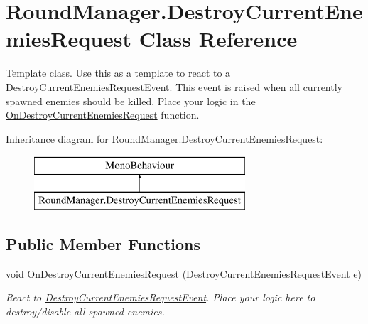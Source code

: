 \hypertarget{class_round_manager_1_1_destroy_current_enemies_request}{}\section{Round\+Manager.\+Destroy\+Current\+Enemies\+Request Class Reference}
\label{class_round_manager_1_1_destroy_current_enemies_request}


Template class. Use this as a template to react to a \hyperlink{class_round_manager_1_1_events_1_1_destroy_current_enemies_request_event}{Destroy\+Current\+Enemies\+Request\+Event}. This event is raised when all currently spawned enemies should be killed. Place your logic in the \hyperlink{class_round_manager_1_1_destroy_current_enemies_request_a15c15c2db192f9bd78a1d2cf5bc6f372}{On\+Destroy\+Current\+Enemies\+Request} function.  


Inheritance diagram for Round\+Manager.\+Destroy\+Current\+Enemies\+Request\+:\begin{figure}[H]
\begin{center}
\leavevmode
\includegraphics[height=2.000000cm]{class_round_manager_1_1_destroy_current_enemies_request}
\end{center}
\end{figure}
\subsection*{Public Member Functions}
\begin{DoxyCompactItemize}
\item 
void \hyperlink{class_round_manager_1_1_destroy_current_enemies_request_a15c15c2db192f9bd78a1d2cf5bc6f372}{On\+Destroy\+Current\+Enemies\+Request} (\hyperlink{class_round_manager_1_1_events_1_1_destroy_current_enemies_request_event}{Destroy\+Current\+Enemies\+Request\+Event} e)
\begin{DoxyCompactList}\small\item\em React to \hyperlink{class_round_manager_1_1_events_1_1_destroy_current_enemies_request_event}{Destroy\+Current\+Enemies\+Request\+Event}. Place your logic here to destroy/disable all spawned enemies. \end{DoxyCompactList}\end{DoxyCompactItemize}


